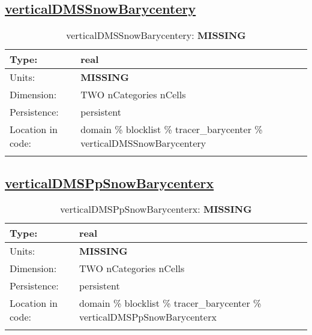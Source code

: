 \subsection[verticalDMSSnowBarycentery]{\hyperref[sec:var_tab_tracer_barycenter]{verticalDMSSnowBarycentery}}
\label{subsec:var_sec_tracer_barycenter_verticalDMSSnowBarycentery}
\begin{center}
\begin{longtable}{| p{2.0in} | p{4.0in} |}
        \hline 
        Type: & real \\
        \hline 
        Units: & {\bf \color{red} MISSING} \\
        \hline 
        Dimension: & TWO nCategories nCells \\
        \hline 
        Persistence: & persistent \\
        \hline 
         Location in code: & domain \% blocklist \% tracer\_barycenter \% verticalDMSSnowBarycentery \\
         \hline 
    \caption{verticalDMSSnowBarycentery: {\bf \color{red} MISSING}}
\end{longtable}
\end{center}
\subsection[verticalDMSPpSnowBarycenterx]{\hyperref[sec:var_tab_tracer_barycenter]{verticalDMSPpSnowBarycenterx}}
\label{subsec:var_sec_tracer_barycenter_verticalDMSPpSnowBarycenterx}
\begin{center}
\begin{longtable}{| p{2.0in} | p{4.0in} |}
        \hline 
        Type: & real \\
        \hline 
        Units: & {\bf \color{red} MISSING} \\
        \hline 
        Dimension: & TWO nCategories nCells \\
        \hline 
        Persistence: & persistent \\
        \hline 
         Location in code: & domain \% blocklist \% tracer\_barycenter \% verticalDMSPpSnowBarycenterx \\
         \hline 
    \caption{verticalDMSPpSnowBarycenterx: {\bf \color{red} MISSING}}
\end{longtable}
\end{center}
